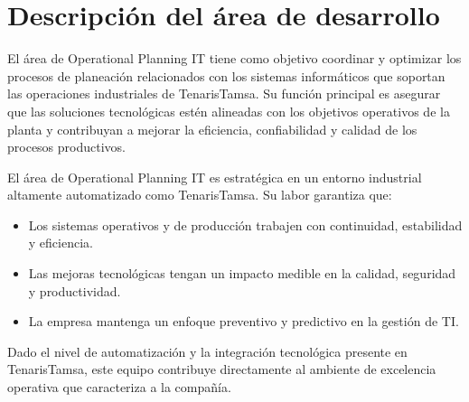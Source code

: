 \section{Descripción del área de desarrollo}

El área de Operational Planning IT tiene como objetivo coordinar y optimizar los procesos de planeación relacionados con los sistemas informáticos que soportan las operaciones industriales de TenarisTamsa. Su función principal es asegurar que las soluciones tecnológicas estén alineadas con los objetivos operativos de la planta y contribuyan a mejorar la eficiencia, confiabilidad y calidad de los procesos productivos. 

El área de Operational Planning IT es estratégica en un entorno industrial altamente automatizado como TenarisTamsa. Su labor garantiza que:

\begin{itemize}
    \item Los sistemas operativos y de producción trabajen con continuidad, estabilidad y eficiencia.
    \item Las mejoras tecnológicas tengan un impacto medible en la calidad, seguridad y productividad.
    \item La empresa mantenga un enfoque preventivo y predictivo en la gestión de TI.
\end{itemize}

 Dado el nivel de automatización y la integración tecnológica presente en TenarisTamsa, este equipo contribuye directamente al ambiente de excelencia operativa que caracteriza a la compañía.